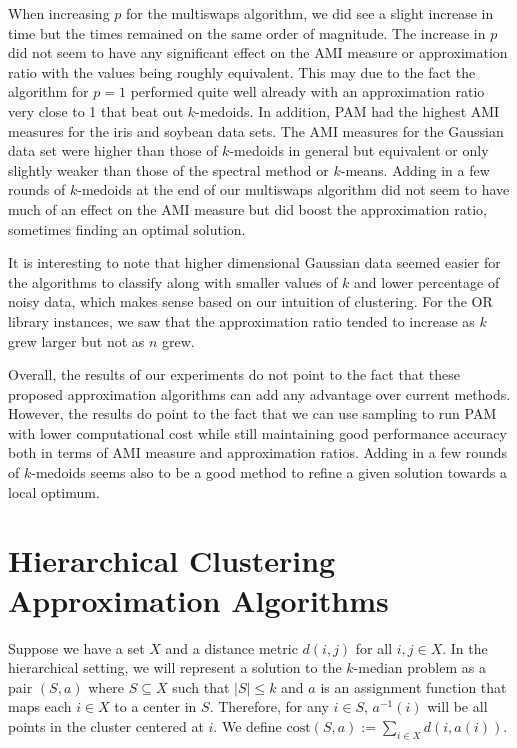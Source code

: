 \documentclass{article}
\begin{document}
When increasing $p$ for the multiswaps algorithm, we did see a slight increase in time but the times remained on the same order of magnitude. The increase in $p$ did not seem to have any significant effect on the AMI measure or approximation ratio with the values being roughly equivalent. This may due to the fact the algorithm for $p=1$ performed quite well already with an approximation ratio very close to 1 that beat out $k$-medoids. In addition, PAM had the highest AMI measures for the iris and soybean data sets. The AMI measures for the Gaussian data set were higher than those of $k$-medoids in general but equivalent or only slightly weaker than those of the spectral method or $k$-means. Adding in a few rounds of $k$-medoids at the end of our multiswaps algorithm did not seem to have much of an effect on the AMI measure but did boost the approximation ratio, sometimes finding an optimal solution. 

It is interesting to note that higher dimensional Gaussian data seemed easier for the algorithms to classify along with smaller values of $k$ and lower percentage of noisy data, which makes sense based on our intuition of clustering. For the OR library instances, we saw that the approximation ratio tended to increase as $k$ grew larger but not as $n$ grew. 

Overall, the results of our experiments do not point to the fact that these proposed approximation algorithms can add any advantage over current methods. However, the results do point to the fact that we can use sampling to run PAM with lower computational cost while still maintaining good performance accuracy both in terms of AMI measure and approximation ratios. Adding in a few rounds of $k$-medoids seems also to be a good method to refine a given solution towards a local optimum.  

\section{Hierarchical Clustering Approximation Algorithms}
Suppose we have a set $X$ and a distance metric $d(i,j)$ for all $i,j \in X$. In the hierarchical setting, we will represent a solution to the $k$-median problem as a pair $(S, a)$ where $S \subseteq X$ such that $|S| \leq k$ and $a$ is an assignment function that maps each $i \in X$ to a center in $S$. Therefore, for any $i \in S$, $a^{-1}(i)$ will be all points in the cluster centered at $i$. We define $\mathrm{cost}(S,a) := \sum_{i \in X} d(i, a(i))$.
\end{document}
